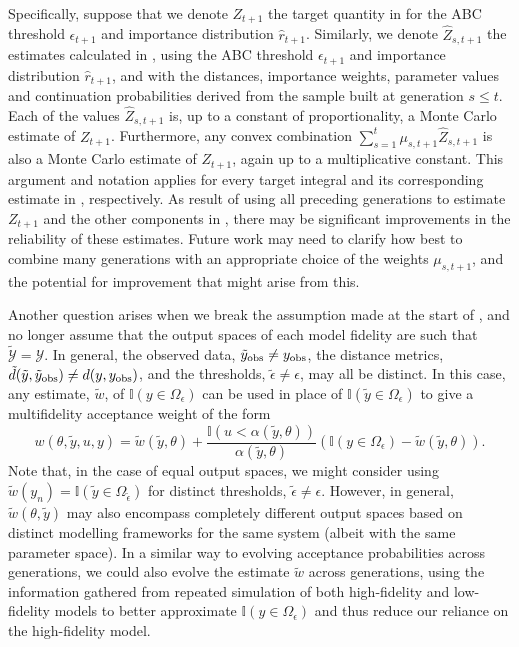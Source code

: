 \documentclass[review,demo]{siamonline190516}
\begin{document}
Specifically, suppose that we denote $Z_{t+1}$ the target quantity in  for the ABC threshold $\epsilon_{t+1}$ and importance distribution $\hat r_{t+1}$.
Similarly, we denote $\hat Z_{s, t+1}$ the estimates calculated in , using the ABC threshold $\epsilon_{t+1}$ and importance distribution $\hat r_{t+1}$, and with the distances, importance weights, parameter values and continuation probabilities derived from the sample built at generation $s \leq t$.
Each of the values $\hat Z_{s, t+1}$ is, up to a constant of proportionality, a Monte Carlo estimate of $Z_{t+1}$.
Furthermore, any convex combination $\sum_{s=1}^{t} \mu_{s, t+1} \hat Z_{s, t+1}$ is also a Monte Carlo estimate of $Z_{t+1}$, again up to a multiplicative constant.
This argument and notation applies for every target integral and its corresponding estimate in , respectively.
As result of using all preceding generations to estimate $Z_{t+1}$ and the other components in , there may be significant improvements in the reliability of these estimates.
Future work may need to clarify how best to combine many generations with an appropriate choice of the weights $\mu_{s,t+1}$, and the potential for improvement that might arise from this.


Another question arises when we break the assumption made at the start of , and no longer assume that the output spaces of each model fidelity are such that $\tilde{\mathcal Y} = \mathcal Y$.
In general, the observed data, $\tilde y_{\mathrm{obs}} \neq y_{\mathrm{obs}}$, the distance metrics, $\tilde d(\tilde y, \tilde y_{\mathrm{obs}}) \neq d(y,y_{\mathrm{obs}})$, and the thresholds, $\tilde \epsilon \neq \epsilon$, may all be distinct.
In this case, any estimate, $\tilde w$, of $\mathbb I(y \in \Omega_\epsilon)$ can be used in place of $\mathbb I(\tilde y \in \Omega_\epsilon)$ to give a multifidelity acceptance weight of the form
\[
 w(\theta, \tilde y, u, y) = \tilde w(\tilde y, \theta) + \frac{\mathbb I(u<\alpha(\tilde y, \theta))}{\alpha(\tilde y, \theta)} \left( \mathbb I(y \in \Omega_\epsilon) - \tilde w(\tilde y, \theta) \right).
\]
Note that, in the case of equal output spaces, we might consider using $\tilde w(y_n) = \mathbb I(\tilde y \in \Omega_{\tilde \epsilon})$ for distinct thresholds, $\tilde \epsilon \neq \epsilon$.
However, in general, $\tilde w(\theta, \tilde y)$ may also encompass completely different output spaces based on distinct modelling frameworks for the same system (albeit with the same parameter space).
In a similar way to evolving acceptance probabilities across generations, we could also evolve the estimate $\tilde w$ across generations, using the information gathered from repeated simulation of both high-fidelity and low-fidelity models to better approximate $\mathbb I(y \in \Omega_\epsilon)$ and thus reduce our reliance on the high-fidelity model.
\end{document}
